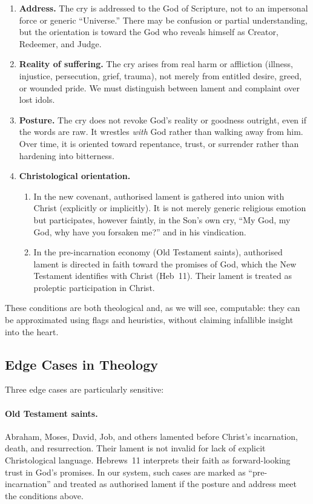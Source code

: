 \documentclass[11pt]{article}
\begin{document}
\begin{enumerate}[label=(\arabic*)]
  \item \textbf{Address.} The cry is addressed to the God of Scripture, not to an impersonal force or generic ``Universe.'' There may be confusion or partial understanding, but the orientation is toward the God who reveals himself as Creator, Redeemer, and Judge.
  \item \textbf{Reality of suffering.} The cry arises from real harm or affliction (illness, injustice, persecution, grief, trauma), not merely from entitled desire, greed, or wounded pride. We must distinguish between lament and complaint over lost idols.
  \item \textbf{Posture.} The cry does not revoke God's reality or goodness outright, even if the words are raw. It wrestles \emph{with} God rather than walking away from him. Over time, it is oriented toward repentance, trust, or surrender rather than hardening into bitterness.
  \item \textbf{Christological orientation.}
    \begin{enumerate}[label=(\alph*)]
      \item In the new covenant, authorised lament is gathered into union with Christ (explicitly or implicitly). It is not merely generic religious emotion but participates, however faintly, in the Son's own cry, ``My God, my God, why have you forsaken me?'' and in his vindication.
      \item In the pre-incarnation economy (Old Testament saints), authorised lament is directed in faith toward the promises of God, which the New Testament identifies with Christ (Heb~11). Their lament is treated as proleptic participation in Christ.
    \end{enumerate}
\end{enumerate}

These conditions are both theological and, as we will see, computable: they can be approximated using flags and heuristics, without claiming infallible insight into the heart.

\subsection{Edge Cases in Theology}

Three edge cases are particularly sensitive:

\paragraph{Old Testament saints.} Abraham, Moses, David, Job, and others lamented before Christ's incarnation, death, and resurrection. Their lament is not invalid for lack of explicit Christological language. Hebrews~11 interprets their faith as forward-looking trust in God's promises. In our system, such cases are marked as ``pre-incarnation'' and treated as authorised lament if the posture and address meet the conditions above.
\end{document}
